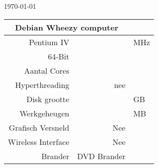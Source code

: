 \documentclass[a4paper,14pt]{extarticle}
\begin{document}
\centerline{\today}
\vskip 0.5cm
\begin{center}
\begin{tabular}{ |r| r| l| }
	\multicolumn{2}{c}{\Huge{Debian Wheezy computer}}\\
	\hline
	Pentium IV & \cpuspeed{} & MHz \\
	64-Bit & \bitssixtyfour{} & \\
	Aantal Cores & \corecount{} & \\
	Hyperthreading & nee & \\
	Disk grootte & \disksize{} & GB \\
	Werkgeheugen & \memsize{} & MB \\
	Grafisch Versneld & Nee & \\
	Wireless Interface & Nee & \\
	Brander & DVD Brander & \\
\end{tabular}
\end{center}
\end{document}
